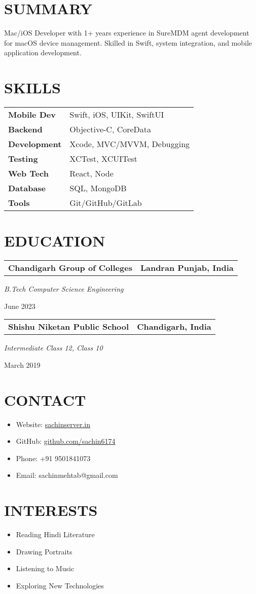 \documentclass[11pt,a4paper]{moderncv}
\newcommand*{\educationentry}[4][0.5mm]{
    \begin{tabularx}{\textwidth}{LR}
        {\bfseries #3} & {\bfseries #4} \\
    \end{tabularx}
    {\itshape #2}
    \par\addvspace{#1}
}
\begin{document}
\begin{minipage}[t]{0.35\textwidth}
\section{SUMMARY}
Mac/iOS Developer with 1+ years experience in SureMDM agent development for macOS device management. Skilled in Swift, system integration, and mobile application development.

\section{SKILLS}
\begin{tabularx}{\textwidth}{>{\bfseries}l@{\hskip 3.5mm}L}
Mobile Dev & Swift, iOS, UIKit, SwiftUI \\
Backend & Objective-C, CoreData \\
Development & Xcode, MVC/MVVM, Debugging \\
Testing & XCTest, XCUITest \\
Web Tech & React, Node \\
Database & SQL, MongoDB \\
Tools & Git/GitHub/GitLab
\end{tabularx}

\section{EDUCATION}
\educationentry{B.Tech Computer Science Engineering}{Chandigarh Group of Colleges}{Landran Punjab, India}{June 2023}
\par
\vspace{3.0mm}
\educationentry{Intermediate Class 12, Class 10}{Shishu Niketan Public School}{Chandigarh, India}{March 2019}

\section{CONTACT}
\begin{itemize}
    \item Website: \href{https://www.sachinserver.in}{sachinserver.in}
    \item GitHub: \href{https://github.com/sachin6174}{github.com/sachin6174}
    \item Phone: +91 9501841073
    \item Email: sachinmehtab@gmail.com
\end{itemize}

\section{INTERESTS}
\begin{itemize}
    \item Reading Hindi Literature
    \item Drawing Portraits
    \item Listening to Music
    \item Exploring New Technologies
\end{itemize}
\end{minipage}
\end{document}
